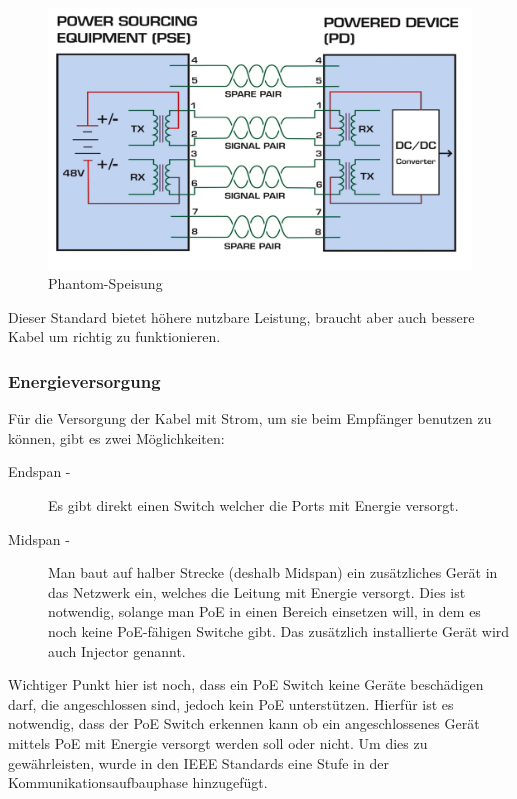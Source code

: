 \begin{figure}[h]
    \centering
    \leavevmode
    \includegraphics[width=1.0\linewidth]{figures/phantom-speisung-marked}
    \caption{Phantom-Speisung \cite{poe1}}
    \label{fig:phantom-speisung}
\end{figure}

Dieser Standard bietet höhere nutzbare Leistung, braucht aber auch bessere Kabel um richtig zu funktionieren.

\subsubsection{Energieversorgung}

Für die Versorgung der Kabel mit Strom, um sie beim Empfänger benutzen zu können, gibt es zwei Möglichkeiten\cite{poe2}:
\begin{description}
 \item[Endspan -] Es gibt direkt einen Switch welcher die Ports mit Energie versorgt.
 \item[Midspan -]Man baut auf halber Strecke (deshalb Midspan) ein zusätzliches Gerät in das Netzwerk ein, welches die Leitung mit Energie versorgt. Dies ist notwendig, solange man PoE in einen Bereich einsetzen will, in dem es noch keine PoE-fähigen Switche gibt. Das zusätzlich installierte Gerät wird auch Injector genannt.
\end{description}

Wichtiger Punkt hier ist noch, dass ein PoE Switch keine Geräte beschädigen darf, die angeschlossen sind, jedoch kein PoE unterstützen. Hierfür ist es notwendig, dass der PoE Switch erkennen kann ob ein angeschlossenes Gerät mittels PoE mit Energie versorgt werden soll oder nicht. Um dies zu gewährleisten, wurde in den IEEE Standards eine Stufe in der Kommunikationsaufbauphase hinzugefügt.

